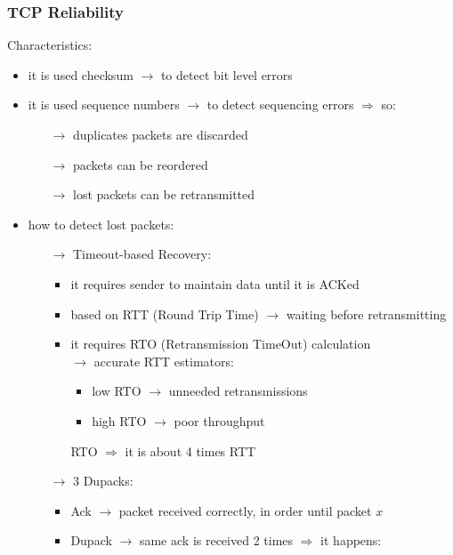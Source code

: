 \subsubsection{TCP Reliability}
Characteristics:
\begin{itemize}
    \item it is used checksum $\rightarrow$ to detect bit level errors
    \item it is used sequence numbers $\rightarrow$ to detect sequencing errors
    $\Rightarrow$ so:
    \begin{itemize}
        \item[$\rightarrow$] duplicates packets are discarded
        \item[$\rightarrow$] packets can be reordered
        \item[$\rightarrow$] lost packets can be retransmitted
    \end{itemize}
    \item how to detect lost packets:
    \begin{itemize}
        \item[$\rightarrow$] Timeout-based Recovery:
        \begin{itemize}
            \item it requires sender to maintain data until it is ACKed
            \item based on RTT (Round Trip Time) $\rightarrow$ waiting before retransmitting
            \item it requires RTO (Retransmission TimeOut) calculation\\$\rightarrow$ accurate RTT estimators:
            \begin{itemize}
                \item low RTO $\rightarrow$ unneeded retransmissions
                \item high RTO $\rightarrow$ poor throughput
            \end{itemize}
            RTO $\Rightarrow$ it is about 4 times RTT
        \end{itemize}
        \item[$\rightarrow$] 3 Dupacks:
        \begin{itemize}
            \item Ack $\rightarrow$ packet received correctly, in order until packet $x$
            \item Dupack $\rightarrow$ same ack is received 2 times $\Rightarrow$ it happens:
            \begin{itemize}

\end{itemize}
\end{itemize}
\end{itemize}
\end{itemize}
